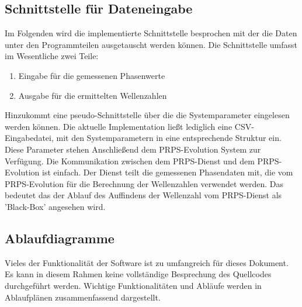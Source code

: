 \subsection{Schnittstelle für Dateneingabe}
%
Im Folgenden wird die implementierte Schnittstelle besprochen mit der die Daten unter den Programmteilen ausgetauscht werden können. Die Schnittstelle umfasst im Wesentliche zwei Teile:
\begin{enumerate}
	\item Eingabe für die gemessenen Phasenwerte
	\item Ausgabe für die ermittelten Wellenzahlen
\end{enumerate}
%
Hinzukommt eine pseudo-Schnittstelle über die die Systemparameter eingelesen werden können. Die aktuelle Implementation ließt lediglich eine CSV-Eingabedatei, mit den Systemparametern in eine entsprechende Struktur ein. Diese Parameter stehen Anschließend dem PRPS-Evolution System zur Verfügung.
%
Die Kommunikation zwischen dem PRPS-Dienst und dem PRPS-Evolution ist einfach. Der Dienst teilt die gemessenen Phasendaten mit, die vom PRPS-Evolution für die Berechnung der Wellenzahlen verwendet werden. Das bedeutet das der Ablauf des Auffindens der Wellenzahl vom PRPS-Dienst als 'Black-Box' angesehen wird.\\
%
%
\subsection{Ablaufdiagramme}
%
Vieles der Funktionalität der Software ist zu umfangreich für dieses Dokument. Es kann in diesem Rahmen keine vollständige Besprechung des Quellcodes durchgeführt werden. Wichtige Funktionalitäten und Abläufe werden in Ablaufplänen zusammenfassend dargestellt.
%

%

%

%


